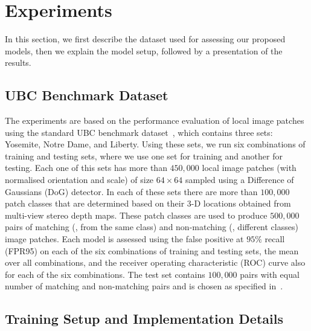 \documentclass[10pt,twocolumn,letterpaper]{article}
\begin{document}
\section{Experiments}

In this section, we first describe the dataset used for assessing our proposed models, then we explain the model setup, followed by a presentation of the results.

\subsection{UBC Benchmark Dataset}


The experiments are based on the performance evaluation of local image patches using the standard UBC benchmark dataset~\cite{UBC_dataset,brownpami10,snavely2008modeling}, which contains three sets: Yosemite, Notre Dame, and Liberty.  Using these sets, we run six combinations of training and testing sets, where we use one set for training and another for testing.  Each one of this sets has more than $450,000$ local image patches (with normalised orientation and scale) of size $64 \times 64$ sampled using a Difference of Gaussians (DoG) detector.  In each of these sets there are more than $100,000$ patch classes that are determined based on their 3-D locations obtained from multi-view stereo depth maps.  These patch classes are used to produce $500,000$ pairs of matching (\ie, from the same class) and non-matching (\ie, different classes) image patches.  Each model is assessed using the false positive at $95\%$ recall (FPR95) on each of the six combinations of training and testing sets, the mean over all combinations, and the receiver operating characteristic (ROC) curve also for each of the six combinations. The test set contains $100,000$ pairs with equal number of matching and non-matching pairs and is chosen as specified in~\cite{UBC_dataset}.


\subsection{Training Setup and Implementation Details}
\label{subsec:experiments}
\end{document}
